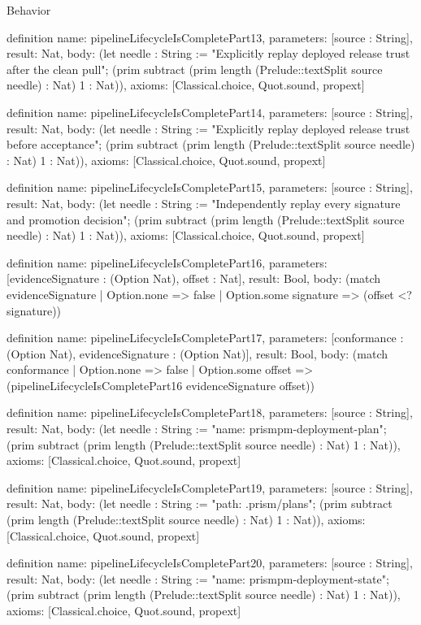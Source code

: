 \begin{lexlean}{Behavior}
\begin{semanticmodule}
definition{
  name: pipelineLifecycleIsCompletePart13,
  parameters: [source : String],
  result: Nat,
  body: (let needle : String := "Explicitly replay deployed release trust after the clean pull"; (prim subtract (prim length (Prelude::textSplit source needle) : Nat) 1 : Nat)),
  axioms: [Classical.choice, Quot.sound, propext]
}

definition{
  name: pipelineLifecycleIsCompletePart14,
  parameters: [source : String],
  result: Nat,
  body: (let needle : String := "Explicitly replay deployed release trust before acceptance"; (prim subtract (prim length (Prelude::textSplit source needle) : Nat) 1 : Nat)),
  axioms: [Classical.choice, Quot.sound, propext]
}

definition{
  name: pipelineLifecycleIsCompletePart15,
  parameters: [source : String],
  result: Nat,
  body: (let needle : String := "Independently replay every signature and promotion decision"; (prim subtract (prim length (Prelude::textSplit source needle) : Nat) 1 : Nat)),
  axioms: [Classical.choice, Quot.sound, propext]
}

definition{
  name: pipelineLifecycleIsCompletePart16,
  parameters: [evidenceSignature : (Option Nat), offset : Nat],
  result: Bool,
  body: (match evidenceSignature
    | Option.none => false
    | Option.some signature => (offset <? signature))
}

definition{
  name: pipelineLifecycleIsCompletePart17,
  parameters: [conformance : (Option Nat), evidenceSignature : (Option Nat)],
  result: Bool,
  body: (match conformance
    | Option.none => false
    | Option.some offset => (pipelineLifecycleIsCompletePart16 evidenceSignature offset))
}

definition{
  name: pipelineLifecycleIsCompletePart18,
  parameters: [source : String],
  result: Nat,
  body: (let needle : String := "name: prismpm-deployment-plan"; (prim subtract (prim length (Prelude::textSplit source needle) : Nat) 1 : Nat)),
  axioms: [Classical.choice, Quot.sound, propext]
}

definition{
  name: pipelineLifecycleIsCompletePart19,
  parameters: [source : String],
  result: Nat,
  body: (let needle : String := "path: .prism/plans"; (prim subtract (prim length (Prelude::textSplit source needle) : Nat) 1 : Nat)),
  axioms: [Classical.choice, Quot.sound, propext]
}

definition{
  name: pipelineLifecycleIsCompletePart20,
  parameters: [source : String],
  result: Nat,
  body: (let needle : String := "name: prismpm-deployment-state"; (prim subtract (prim length (Prelude::textSplit source needle) : Nat) 1 : Nat)),
  axioms: [Classical.choice, Quot.sound, propext]
}


\end{semanticmodule}
\end{lexlean}
